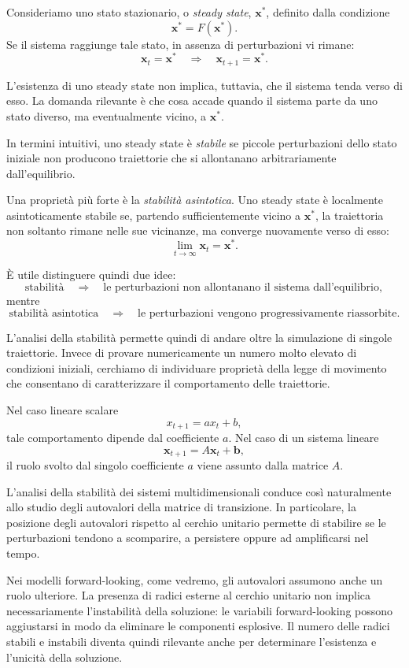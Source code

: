 \documentclass{book}
\begin{document}
Consideriamo uno stato stazionario, o \emph{steady state},
$\mathbf{x}^*$, definito dalla condizione
\[
\mathbf{x}^*=F(\mathbf{x}^*).
\]
Se il sistema raggiunge tale stato, in assenza di perturbazioni vi
rimane:
\[
\mathbf{x}_t=\mathbf{x}^*
\quad\Rightarrow\quad
\mathbf{x}_{t+1}=\mathbf{x}^*.
\]

L'esistenza di uno steady state non implica, tuttavia, che il sistema
tenda verso di esso. La domanda rilevante è che cosa accade quando il
sistema parte da uno stato diverso, ma eventualmente vicino, a
$\mathbf{x}^*$.

In termini intuitivi, uno steady state è \emph{stabile} se piccole
perturbazioni dello stato iniziale non producono traiettorie che si
allontanano arbitrariamente dall'equilibrio.

Una proprietà più forte è la \emph{stabilità asintotica}. Uno steady
state è localmente asintoticamente stabile se, partendo
sufficientemente vicino a $\mathbf{x}^*$, la traiettoria non soltanto
rimane nelle sue vicinanze, ma converge nuovamente verso di esso:
\[
\lim_{t\rightarrow\infty}\mathbf{x}_t=\mathbf{x}^*.
\]

È utile distinguere quindi due idee:
\[
\text{stabilità}
\quad\Rightarrow\quad
\text{le perturbazioni non allontanano il sistema dall'equilibrio},
\]
mentre
\[
\text{stabilità asintotica}
\quad\Rightarrow\quad
\text{le perturbazioni vengono progressivamente riassorbite}.
\]

L'analisi della stabilità permette quindi di andare oltre la
simulazione di singole traiettorie. Invece di provare numericamente un
numero molto elevato di condizioni iniziali, cerchiamo di individuare
proprietà della legge di movimento che consentano di caratterizzare
il comportamento delle traiettorie.

Nel caso lineare scalare
\[
x_{t+1}=a x_t+b,
\]
tale comportamento dipende dal coefficiente $a$. Nel caso di un
sistema lineare
\[
\mathbf{x}_{t+1}=A\mathbf{x}_t+\mathbf{b},
\]
il ruolo svolto dal singolo coefficiente $a$ viene assunto dalla
matrice $A$.

L'analisi della stabilità dei sistemi multidimensionali conduce così
naturalmente allo studio degli autovalori della matrice di transizione.
In particolare, la posizione degli autovalori rispetto al cerchio
unitario permette di stabilire se le perturbazioni tendono a
scomparire, a persistere oppure ad amplificarsi nel tempo.

Nei modelli forward-looking, come vedremo, gli autovalori assumono
anche un ruolo ulteriore. La presenza di radici esterne al cerchio
unitario non implica necessariamente l'instabilità della soluzione:
le variabili forward-looking possono aggiustarsi in modo da eliminare
le componenti esplosive. Il numero delle radici stabili e instabili
diventa quindi rilevante anche per determinare l'esistenza e
l'unicità della soluzione.
\end{document}
